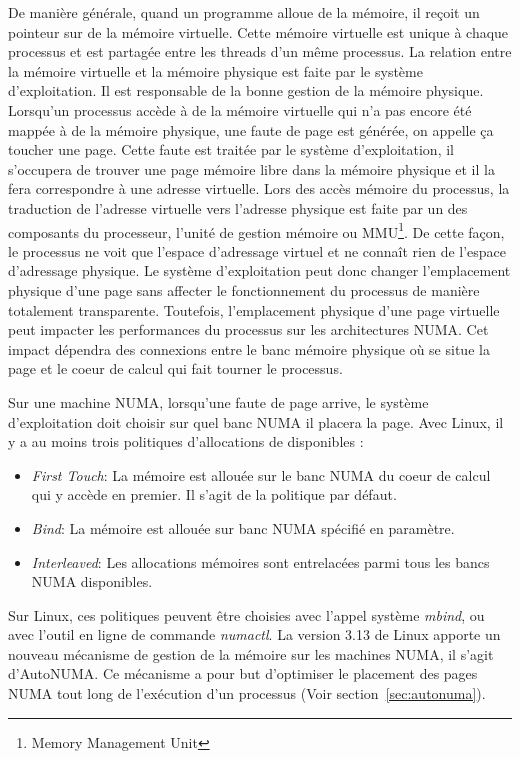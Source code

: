 De manière générale, quand un programme alloue de la mémoire, il reçoit un pointeur sur de la mémoire virtuelle.
%
Cette mémoire virtuelle est unique à chaque processus et est partagée entre les threads d'un même processus.
%
La relation entre la mémoire virtuelle et la mémoire physique est faite par le système d'exploitation.
%
Il est responsable de la bonne gestion de la mémoire physique.
%
Lorsqu'un processus accède à de la mémoire virtuelle qui n'a pas encore été mappée à de la mémoire physique, une faute de page est générée, on appelle ça toucher une page.
%
Cette faute est traitée par le système d'exploitation, il s'occupera de trouver une page mémoire libre dans la mémoire physique et il la fera correspondre à une adresse virtuelle.
%
Lors des accès mémoire du processus, la traduction de l'adresse virtuelle vers l'adresse physique est faite par un des composants du processeur, l'unité de gestion mémoire ou MMU\footnote{Memory Management Unit}.
%
De cette façon, le processus ne voit que l'espace d'adressage virtuel et ne connaît rien de l'espace d'adressage physique.
%
Le système d'exploitation peut donc changer l'emplacement physique d'une page sans affecter le fonctionnement du processus de manière totalement transparente.
%
Toutefois, l'emplacement physique d'une page virtuelle peut impacter les performances du processus sur les architectures NUMA.
%
Cet impact dépendra des connexions entre le banc mémoire physique où se situe la page et le coeur de calcul qui fait tourner le processus.

Sur une machine NUMA, lorsqu'une faute de page arrive, le système d'exploitation doit choisir sur quel banc NUMA il placera la page.
%
Avec Linux, il y a au moins trois politiques d'allocations de disponibles :
\begin{itemize}
        \item {\em First Touch}: La mémoire est allouée sur le banc NUMA du coeur de calcul qui y accède en premier.
                         Il s'agit de la politique par défaut.
        \item {\em Bind}: La mémoire est allouée sur banc NUMA spécifié en paramètre.
        \item {\em Interleaved}: Les allocations mémoires sont entrelacées parmi tous les bancs NUMA disponibles.
\end{itemize}
Sur Linux, ces politiques peuvent être choisies avec l'appel système {\em mbind}, ou avec l'outil en ligne de commande {\em numactl}.
%
La version 3.13 de Linux apporte un nouveau mécanisme de gestion de la mémoire sur les machines NUMA, il s'agit d'AutoNUMA.
%
Ce mécanisme a pour but d'optimiser le placement des pages NUMA tout long de l'exécution d'un processus (Voir section~\ref{sec:autonuma}).

